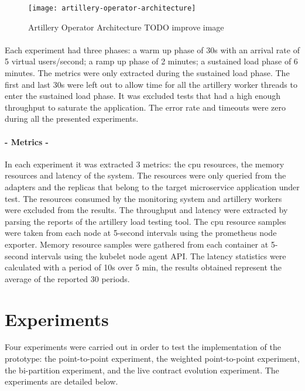 \begin{figure}[htbp]
    \centering
    \centerline{\texttt{[image: artillery-operator-architecture]}}
    \caption{Artillery Operator Architecture TODO improve image}
    \label{fig:artilleryoperator}
\end{figure}

\paragraph{}

Each experiment had three phases:
a warm up phase of 30s with an arrival rate of 5 virtual users/second;
a ramp up phase of 2 minutes;
a sustained load phase of 6 minutes.
The metrics were only extracted during the sustained load phase.
The first and last 30s were left out to allow time for all the artillery worker threads to enter the sustained load phase.
It was excluded tests that had a high enough throughput to saturate the application.
The error rate and timeouts were zero during all the presented experiments.

\paragraph{- Metrics -}

In each experiment it was extracted 3 metrics: the cpu resources, the memory resources and latency of the system.
The resources were only queried from the adapters and the replicas that belong to the target microservice application under test.
The resources consumed by the monitoring system and artillery workers were excluded from the results.
The throughput and latency were extracted by parsing the reports of the artillery load testing tool.
The cpu resource samples were taken from each node at 5-second intervals using the prometheus node exporter.
Memory resource samples were gathered from each container at 5-second intervals using the kubelet node agent API.
The latency statistics were calculated with a period of 10s over 5 min, the results obtained represent the
average of the reported 30 periods.

\section{Experiments} %
\label{sec:experiments}

Four experiments were carried out in order to test the implementation of the prototype:
the point-to-point experiment, the weighted point-to-point experiment, the bi-partition experiment, and the live contract evolution experiment.
The experiments are detailed below.

